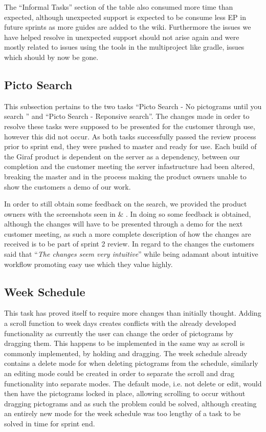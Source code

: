 The ``Informal Tasks'' section of the table also consumed more time than expected, although unexpected support is expected to be consume less EP in future sprints as more guides are added to the wiki.
Furthermore the issues we have helped resolve in unexpected support should not arise again and were mostly related to issues using the tools in the multiproject like gradle, issues which should by now be gone.

\subsection{Picto Search}
This subsection pertains to the two tasks ``Picto Search - No pictograms until you search '' and ``Picto Search - Reponsive search''.
The changes made in order to resolve these tasks were supposed to be presented for the customer through use, however this did not occur.
As both tasks successfully passed the review process prior to sprint end, they were pushed to master and ready for use.
Each build of the Giraf product is dependent on the server as a dependency, between our completion and the customer meeting the server infastructure had been altered, breaking the master and in the process making the product owners unable to show the customers a demo of our work.

In order to still obtain some feedback on the search, we provided the product owners with the screenshots seen in  \& .
In doing so some feedback is obtained, although the changes will have to be presented through a demo for the next customer meeting, as such a more complete description of how the changes are received is to be part of sprint 2 review.   
In regard to the changes the customers said that ``\textit{The changes seem very intuitive}'' while being adamant about intuitive workflow promoting easy use which they value highly.

\subsection{Week Schedule}
This task has proved itself to require more changes than initially thought.
Adding a scroll function to week days creates conflicts with the already developed functionality as currently the user can change the order of pictograms by dragging them.
This happens to be implemented in the same way as scroll is commonly implemented, by holding and dragging.
The week schedule already contains a delete mode for when deleting pictograms from the schedule, similarly an editing mode could be created in order to separate the scroll and drag functionality into separate modes.
The default mode, i.e. not delete or edit, would then have the pictograms locked in place, allowing scrolling to occur without dragging pictograms and as such the problem could be solved, although creating an entirely new mode for the week schedule was too lengthy of a task to be solved in time for sprint end.